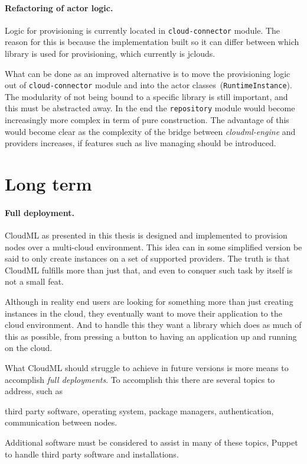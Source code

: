 \paragraph{Refactoring of actor logic.}

Logic for provisioning is currently located in \texttt{cloud-connector} module.
The reason for this is because the implementation built so it can differ between which library is used for provisioning, 
which currently is jclouds.

What can be done as an improved alternative is to move the provisioning logic out of \texttt{cloud-connector} 
module and into the actor classes~(\texttt{RuntimeInstance}).
The modularity of not being bound to a specific library is still important, and this must be abstracted away.
In the end the \texttt{repository} module would become increasingly more complex in term of pure construction.
The advantage of this would become clear as the complexity of the bridge between \emph{cloudml-engine}
and providers increases, \eg if features such as live managing should be introduced.

\section{Long term}

\paragraph{Full deployment.}

CloudML as presented in this thesis is designed and implemented to provision nodes over a multi-cloud environment.
This idea can in some simplified version be said to only create instances on a set of supported providers.
The truth is that CloudML fulfills more than just that, and even to conquer such task by itself is not a small feat.

Although in reality end users are looking for something more than just creating instances in the cloud,
they eventually want to move their application to the cloud environment.
And to handle this they want a library which does as much of this as possible,
from pressing a button to having an application up and running on the cloud.

What CloudML should struggle to achieve in future versions is more means to accomplish \emph{full deployments}.
To accomplish this there are several topics to address, such as
\begin{ii}
  \iitem third party software,
  \iitem operating system,
  \iitem package managers,
  \iitem authentication,
  \iitem communication between nodes.
\end{ii}
Additional software must be considered to assist in many of these topics,
\eg Puppet to handle third party software and installations.

